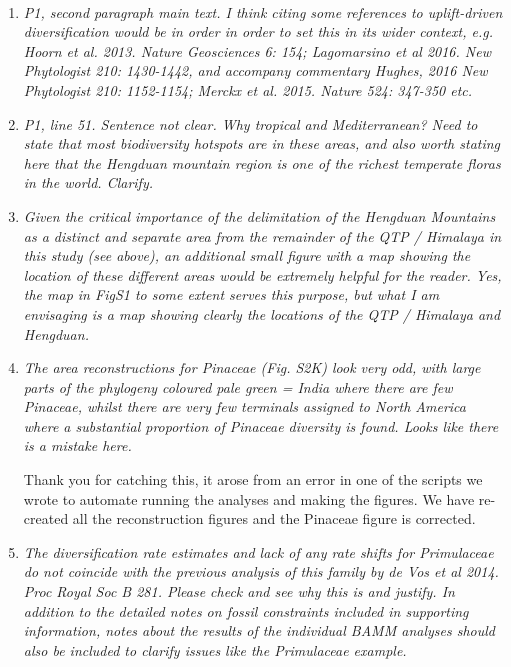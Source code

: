 \documentclass[12pt]{letter}
\begin{document}
\begin{letter}{ \\

}
\begin{enumerate}
  We have revised the end of the Abstract to clarify that the novelty
  of the quantitative evidence is specific to the Hengduan region. We
  also make note of the methodological novelty of our study and its
  potential application to other hotspots.

\item \textit{P1, second paragraph main text. I think citing some
    references to uplift-driven diversification would be in order in
    order to set this in its wider context, e.g. Hoorn et
    al. 2013. Nature Geosciences 6: 154; Lagomarsino et al 2016. New
    Phytologist 210: 1430-1442, and accompany commentary Hughes, 2016
    New Phytologist 210: 1152-1154; Merckx et al. 2015. Nature 524:
    347-350 etc.}

\item \textit{P1, line 51. Sentence not clear. Why tropical and
    Mediterranean? Need to state that most biodiversity hotspots are
    in these areas, and also worth stating here that the Hengduan
    mountain region is one of the richest temperate floras in the
    world. Clarify.}

\item \textit{Given the critical importance of the delimitation of the
    Hengduan Mountains as a distinct and separate area from the
    remainder of the QTP / Himalaya in this study (see above), an
    additional small figure with a map showing the location of these
    different areas would be extremely helpful for the reader. Yes,
    the map in FigS1 to some extent serves this purpose, but what I am
    envisaging is a map showing clearly the locations of the QTP /
    Himalaya and Hengduan.}

\item \textit{The area reconstructions for Pinaceae (Fig. S2K) look
    very odd, with large parts of the phylogeny coloured pale green =
    India where there are few Pinaceae, whilst there are very few
    terminals assigned to North America where a substantial proportion
    of Pinaceae diversity is found. Looks like there is a mistake
    here.}

  Thank you for catching this, it arose from an error in one of the
  scripts we wrote to automate running the analyses and making the
  figures. We have re-created all the reconstruction figures and the
  Pinaceae figure is corrected.

\item \textit{The diversification rate estimates and lack of any rate
    shifts for Primulaceae do not coincide with the previous analysis
    of this family by de Vos et al 2014. Proc Royal Soc B 281. Please
    check and see why this is and justify. In addition to the detailed
    notes on fossil constraints included in supporting information,
    notes about the results of the individual BAMM analyses should
    also be included to clarify issues like the Primulaceae example.}


\end{enumerate}
\end{letter}
\end{document}

